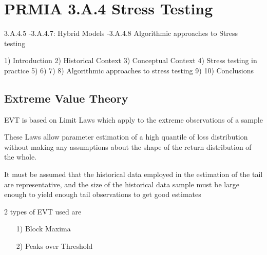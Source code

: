 
\section{PRMIA 3.A.4 Stress Testing}

3.A.4.5
-3.A.4.7: Hybrid Models
-3.A.4.8 Algorithmic approaches to Stress testing


1) Introduction
2) Historical Context
3) Conceptual Context
4) Stress testing in practice
5) 
6)
7) 
8) Algorithmic approaches to stress testing
9)
10) Conclusions

\subsection{Extreme Value Theory}

EVT is based on Limit Laws which apply to the extreme observations of a sample

These Laws allow parameter estimation of a high quantile of loss distribution without making any assumptions about the shape of the return distribution of the whole.

It must be assumed that the historical data employed in the estimation of the tail are representative, and the size of the historical data sample must be large enough to yield
enough tail observations to get good estimates

2 types of EVT used are
\begin{itemize}
\item[1)] Block Maxima
\item[2)] Peaks over Threshold
\end{itemize}
